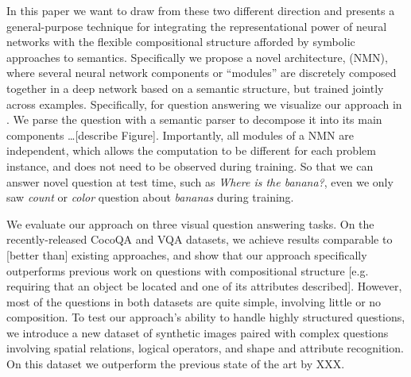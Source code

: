 In this paper we want to draw from these two different direction and presents a general-purpose technique for integrating the
representational power of neural networks with the flexible compositional
structure afforded by symbolic approaches to semantics. 
Specifically we propose a novel architecture, \nmn (NMN), where several neural network components or ``modules'' are discretely composed together in a deep network based on a semantic structure, but trained jointly across examples.  Specifically, for question answering we visualize our approach in . We parse the question with a semantic parser to decompose it into its main components \ldots [describe Figure].
Importantly, all modules of a NMN are independent, which allows the computation to be different for each problem instance, and does not need to be observed during training. So that we can answer novel question at test time, such as \emph{Where is the banana?}, even we only saw \emph{count} or \emph{color} question about \emph{bananas} during training.








We evaluate our approach on three visual question answering tasks. On the
recently-released CocoQA and VQA datasets, we achieve results comparable to
[better than] existing approaches, and show that our approach specifically outperforms
previous work on questions with compositional structure [e.g. requiring that an
object be located and one of its attributes described]. However, most of the
questions in both datasets are quite simple, involving little or no composition.
To test our approach's ability to handle highly structured questions, we
introduce a new dataset of synthetic images paired with complex questions
involving spatial relations, logical operators, and shape and attribute
recognition. On this dataset we outperform the previous state of the art by XXX.

